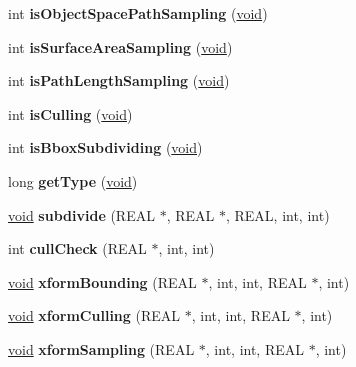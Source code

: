 \begin{DoxyCompactItemize}
int {\bfseries is\+Object\+Space\+Path\+Sampling} (\hyperlink{interfacevoid}{void})
\item 
\mbox{\label{class_mapdesc_ae81d18b909c9b86b266fc61905a1b672}} 
int {\bfseries is\+Surface\+Area\+Sampling} (\hyperlink{interfacevoid}{void})
\item 
\mbox{\label{class_mapdesc_ad3bc4fe18c0656383a09078eedc8fbba}} 
int {\bfseries is\+Path\+Length\+Sampling} (\hyperlink{interfacevoid}{void})
\item 
\mbox{\label{class_mapdesc_a405b1538008079242d916b549ea9e93d}} 
int {\bfseries is\+Culling} (\hyperlink{interfacevoid}{void})
\item 
\mbox{\label{class_mapdesc_a4a912e083df552938ca7f3ad20143638}} 
int {\bfseries is\+Bbox\+Subdividing} (\hyperlink{interfacevoid}{void})
\item 
\mbox{\label{class_mapdesc_a6ee671aca353f137c89bb608d0f8acfb}} 
long {\bfseries get\+Type} (\hyperlink{interfacevoid}{void})
\item 
\mbox{\label{class_mapdesc_a5d01b24404f7a4d5926ad8ff67e5e403}} 
\hyperlink{interfacevoid}{void} {\bfseries subdivide} (R\+E\+AL $\ast$, R\+E\+AL $\ast$, R\+E\+AL, int, int)
\item 
\mbox{\label{class_mapdesc_a84013a46e7feedecc1b86a3c99dc191c}} 
int {\bfseries cull\+Check} (R\+E\+AL $\ast$, int, int)
\item 
\mbox{\label{class_mapdesc_aa5056f5dafb11dafc692ff12af61bf48}} 
\hyperlink{interfacevoid}{void} {\bfseries xform\+Bounding} (R\+E\+AL $\ast$, int, int, R\+E\+AL $\ast$, int)
\item 
\mbox{\label{class_mapdesc_a24d49597a33eedaefcd98f3b1a1cb741}} 
\hyperlink{interfacevoid}{void} {\bfseries xform\+Culling} (R\+E\+AL $\ast$, int, int, R\+E\+AL $\ast$, int)
\item 
\mbox{\label{class_mapdesc_ae603a6e1bc9a87cf4e3f19d5420f2cf4}} 
\hyperlink{interfacevoid}{void} {\bfseries xform\+Sampling} (R\+E\+AL $\ast$, int, int, R\+E\+AL $\ast$, int)

\end{DoxyCompactItemize}

